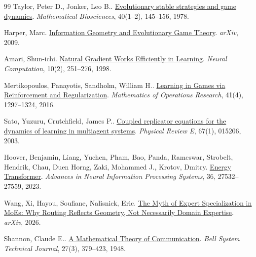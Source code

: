 \documentclass[11pt]{article}
\begin{document}
\begin{thebibliography}{99}
Taylor, Peter D., Jonker, Leo B..
\newblock \href{https://doi.org/10.1016/0025-5564(78)90077-9}{Evolutionary stable strategies and game dynamics}.
\newblock \emph{Mathematical Biosciences}, 40(1--2), 145--156, 1978.

Harper, Marc.
\newblock \href{https://arxiv.org/abs/0911.1383}{Information Geometry and Evolutionary Game Theory}.
\newblock \emph{arXiv}, 2009.

Amari, Shun-ichi.
\newblock \href{https://doi.org/10.1162/089976698300017746}{Natural Gradient Works Efficiently in Learning}.
\newblock \emph{Neural Computation}, 10(2), 251--276, 1998.

Mertikopoulos, Panayotis, Sandholm, William H..
\newblock \href{https://doi.org/10.1287/moor.2016.0778}{Learning in Games via Reinforcement and Regularization}.
\newblock \emph{Mathematics of Operations Research}, 41(4), 1297--1324, 2016.

Sato, Yuzuru, Crutchfield, James P..
\newblock \href{https://doi.org/10.1103/PhysRevE.67.015206}{Coupled replicator equations for the dynamics of learning in multiagent systems}.
\newblock \emph{Physical Review E}, 67(1), 015206, 2003.

Hoover, Benjamin, Liang, Yuchen, Pham, Bao, Panda, Rameswar, Strobelt, Hendrik, Chau, Duen Horng, Zaki, Mohammed J., Krotov, Dmitry.
\newblock \href{https://proceedings.neurips.cc/paper_files/paper/2023/hash/57a9b97477b67936298489e3c1417b0a-Abstract-Conference.html}{Energy Transformer}.
\newblock \emph{Advances in Neural Information Processing Systems}, 36, 27532--27559, 2023.

Wang, Xi, Hayou, Soufiane, Nalisnick, Eric.
\newblock \href{https://arxiv.org/abs/2604.09780}{The Myth of Expert Specialization in MoEs: Why Routing Reflects Geometry, Not Necessarily Domain Expertise}.
\newblock \emph{arXiv}, 2026.

Shannon, Claude E..
\newblock \href{https://doi.org/10.1002/j.1538-7305.1948.tb01338.x}{A Mathematical Theory of Communication}.
\newblock \emph{Bell System Technical Journal}, 27(3), 379--423, 1948.

\end{thebibliography}
\end{document}
